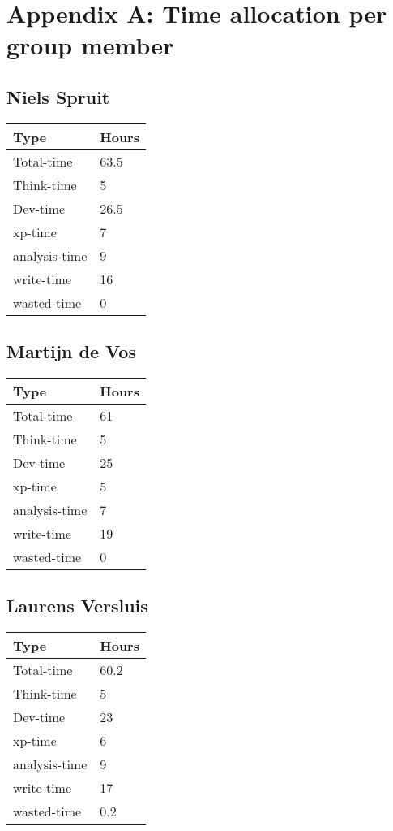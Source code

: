 \section{Appendix A: Time allocation per group member}
\label{apx:time-allocation}

	\subsection{Niels Spruit}
	
	\begin{tabular}{|l|l|}
		\hline 
		Type			& Hours	\\ \hline
		Total-time 		& 63.5	\\ \hline
		Think-time 		& 5		\\ \hline
		Dev-time   		& 26.5	\\ \hline
		xp-time    		& 7		\\ \hline
		analysis-time 	& 9		\\ \hline
		write-time		& 16	\\ \hline
		wasted-time 	& 0	\\ \hline
		
	\end{tabular}
	
	\subsection{Martijn de Vos}
		
	\begin{tabular}{|l|l|}
		\hline 
		Type			& Hours	\\ \hline
		Total-time 		& 61	\\ \hline
		Think-time 		& 5		\\ \hline
		Dev-time   		& 25	\\ \hline
		xp-time    		& 5		\\ \hline
		analysis-time 	& 7		\\ \hline
		write-time		& 19	\\ \hline
		wasted-time 	& 0	\\ \hline
		
	\end{tabular}
	
	\subsection{Laurens Versluis}
			
	\begin{tabular}{|l|l|}
		\hline 
		Type			& Hours	\\ \hline
		Total-time 		& 60.2	\\ \hline
		Think-time 		& 5		\\ \hline
		Dev-time   		& 23	\\ \hline
		xp-time    		& 6		\\ \hline
		analysis-time 	& 9		\\ \hline
		write-time		& 17	\\ \hline
		wasted-time 	& 0.2	\\ \hline
		
	\end{tabular}